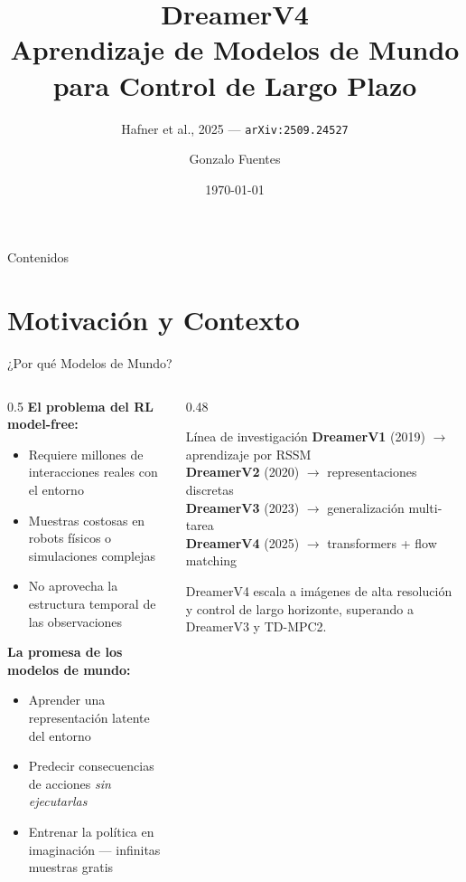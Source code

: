 \documentclass[aspectratio=169, 12pt]{beamer}
\title{\textbf{DreamerV4}\\[4pt]
       \large Aprendizaje de Modelos de Mundo para Control de Largo Plazo}
\subtitle{Hafner et al., 2025 — \texttt{arXiv:2509.24527}}
\author{Gonzalo Fuentes}
\institute{Magíster en Ciencias de la Computación}
\date{\today}
\begin{document}
\begin{frame}
\titlepage
\end{frame}

\begin{frame}{Contenidos}
\tableofcontents
\end{frame}

\section{Motivación y Contexto}

\begin{frame}{¿Por qué Modelos de Mundo?}
\begin{columns}[T]
  \begin{column}{0.5\textwidth}
    \textbf{El problema del RL model-free:}
    \begin{itemize}
      \item Requiere millones de interacciones reales con el entorno
      \item Muestras costosas en robots físicos o simulaciones complejas
      \item No aprovecha la estructura temporal de las observaciones
    \end{itemize}
    \vspace{8pt}
    \textbf{La promesa de los modelos de mundo:}
    \begin{itemize}
      \item Aprender una representación latente del entorno
      \item Predecir consecuencias de acciones \emph{sin ejecutarlas}
      \item Entrenar la política en \alert{imaginación} — infinitas muestras gratis
    \end{itemize}
  \end{column}
  \begin{column}{0.48\textwidth}
    \begin{block}{Línea de investigación}
      \centering
      \vspace{4pt}
      \textbf{DreamerV1} (2019) $\rightarrow$ aprendizaje por RSSM\\[4pt]
      \textbf{DreamerV2} (2020) $\rightarrow$ representaciones discretas\\[4pt]
      \textbf{DreamerV3} (2023) $\rightarrow$ generalización multi-tarea\\[4pt]
      \textbf{DreamerV4} (2025) $\rightarrow$ \alert{transformers + flow matching}
    \end{block}
    \vspace{8pt}
    \small DreamerV4 escala a imágenes de alta resolución y control de largo horizonte, superando a DreamerV3 y TD-MPC2.
  \end{column}
\end{columns}
\end{frame}
\end{document}
